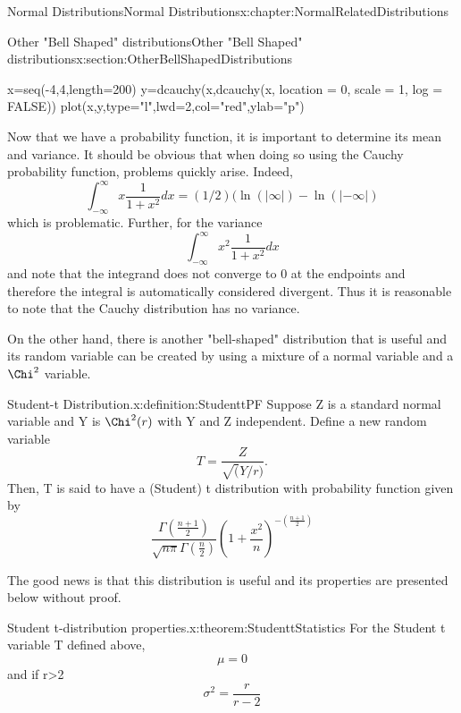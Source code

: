 \documentclass[oneside,10pt,]{book}
\numberwithin{equation}{section}
\begin{document}
\begin{chapterptx}{Normal Distributions}{}{Normal Distributions}{}{}{x:chapter:NormalRelatedDistributions}
\begin{sectionptx}{Other "Bell Shaped" distributions}{}{Other "Bell Shaped" distributions}{}{}{x:section:OtherBellShapedDistributions}
\begin{sageinput}
x=seq(-4,4,length=200)
y=dcauchy(x,dcauchy(x, location = 0, scale = 1, log = FALSE))
plot(x,y,type="l",lwd=2,col="red",ylab="p")
\end{sageinput}
Now that we have a probability function, it is important to determine its mean and variance. It should be obvious that when doing so using the Cauchy probability function, problems quickly arise.  Indeed,%
\begin{equation*}
\int_{-\infty}^{\infty} x \frac{1}{1+x^2} dx = (1/2) ( \ln( | \infty |) - \ln( | -\infty |)
\end{equation*}
which is problematic.  Further, for the variance%
\begin{equation*}
\int_{-\infty}^{\infty} x^2 \frac{1}{1+x^2} dx 
\end{equation*}
and note that the integrand does not converge to 0 at the endpoints and therefore the integral is automatically considered divergent.  Thus it is reasonable to note that the Cauchy distribution has no variance.%
\par
On the other hand, there is another "bell-shaped" distribution that is useful and its random variable can be created by using a mixture of a normal variable and a \(\Chi^2\) variable.%
\par
\begin{definition}{Student-t Distribution.}{x:definition:StudenttPF}%
Suppose Z is a standard normal variable and Y is \(\Chi^2(r)\) with Y and Z independent.  Define a new random variable%
\begin{equation*}
T = \frac{Z}{\sqrt(Y/r)}.
\end{equation*}
Then, T is said to have a (Student) t distribution with probability function given by%
\begin{equation*}
\frac{\Gamma \left ( \frac{n+1}{2} \right ) }{\sqrt{n \pi} \Gamma \left ( \frac{n}{2} \right ) } \left ( 1 + \frac{x^2}{n}\right )^{ - \left ( \frac{n+1}{2} \right )}  
\end{equation*}
%
\end{definition}
 The good news is that this distribution is useful and its properties are presented below without proof. \begin{theorem}{Student t-distribution properties.}{}{x:theorem:StudenttStatistics}%
For the Student t variable T defined above,%
\begin{equation*}
\mu = 0
\end{equation*}
and if r\textgreater{}2%
\begin{equation*}
\sigma^2 = \frac{r}{r-2}

\end{equation*}
\end{theorem}
\end{sectionptx}
\end{chapterptx}
\end{document}

